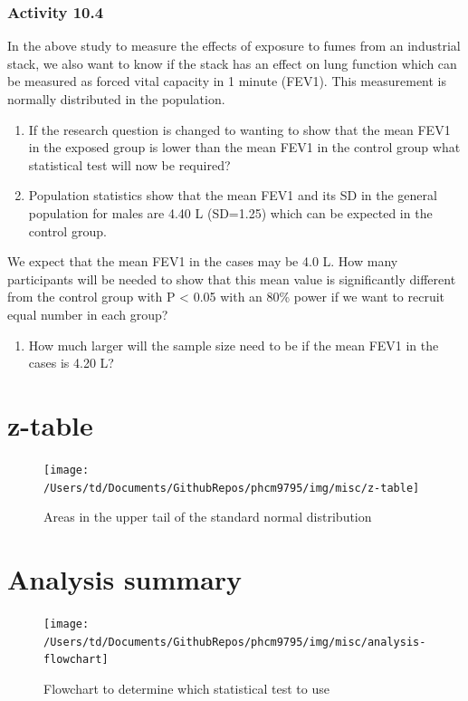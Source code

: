 \documentclass[
]{memoir}
\providecommand{\tightlist}{%
  \setlength{\itemsep}{0pt}\setlength{\parskip}{0pt}}
\begin{document}
\hypertarget{activity-10.4}{%
\subsection*{Activity 10.4}\label{activity-10.4}}

In the above study to measure the effects of exposure to fumes from an industrial stack, we also want to know if the stack has an effect on lung function which can be measured as forced vital capacity in 1 minute (FEV1). This measurement is normally distributed in the population.

\begin{enumerate}
\def\labelenumi{\alph{enumi})}
\tightlist
\item
  If the research question is changed to wanting to show that the mean FEV1 in the exposed group is lower than the mean FEV1 in the control group what statistical test will now be required?
\item
  Population statistics show that the mean FEV1 and its SD in the general population for males are 4.40 L (SD=1.25) which can be expected in the control group.
\end{enumerate}

We expect that the mean FEV1 in the cases may be 4.0 L.
How many participants will be needed to show that this mean value is significantly different from the control group with P \textless{} 0.05 with an 80\% power if we want to recruit equal number in each group?

\begin{enumerate}
\def\labelenumi{\alph{enumi})}
\setcounter{enumi}{2}
\tightlist
\item
  How much larger will the sample size need to be if the mean FEV1 in the cases is 4.20 L?
\end{enumerate}

\hypertarget{appendix-appendix}{%
\appendix}


\hypertarget{z-table}{%
\chapter{z-table}\label{z-table}}

\begin{figure}
\texttt{[image: /Users/td/Documents/GithubRepos/phcm9795/img/misc/z-table]} \caption{Areas in the upper tail of the standard normal distribution}\label{fig:unnamed-chunk-123}
\end{figure}

\hypertarget{analysis-summary}{%
\chapter{Analysis summary}\label{analysis-summary}}

\begin{figure}
\texttt{[image: /Users/td/Documents/GithubRepos/phcm9795/img/misc/analysis-flowchart]} \caption{Flowchart to determine which statistical test to use}\label{fig:unnamed-chunk-124}
\end{figure}

  
\end{document}
